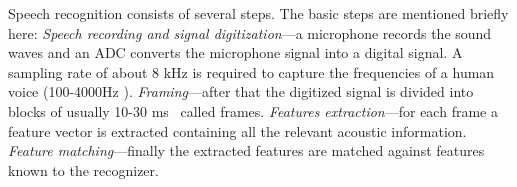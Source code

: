  Speech recognition consists of several steps. The basic steps are mentioned briefly here:
\textit{Speech recording and signal digitization}---a microphone records the sound waves and an ADC converts the microphone signal into a digital signal. A sampling rate of about 8 kHz is required to capture the frequencies of a human voice (100-4000Hz \cite{Bernal-Ruiz2005}). \textit{Framing}---after that the digitized signal is divided into blocks of usually 10-30 ms~\cite{gaikwad2010review,delaney2002low,delaney2005energy} called frames. \textit{Features extraction}---for each frame a feature vector is extracted containing all the relevant acoustic information. \textit{Feature matching}---finally the extracted features are matched against features known to the recognizer. 

